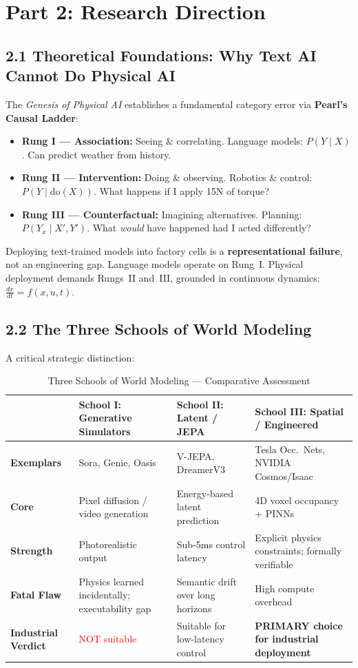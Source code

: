 \documentclass[11pt,a4paper]{article}
\begin{document}
\section{Part 2: Research Direction}

\subsection{2.1 Theoretical Foundations: Why Text AI Cannot Do Physical AI}
The \textit{Genesis of Physical AI} establishes a fundamental category error via \textbf{Pearl's Causal Ladder}:
\begin{itemize}
    \item \textbf{Rung I --- Association:} Seeing \& correlating. Language models: $P(Y \mid X)$. Can predict weather from history.
    \item \textbf{Rung II --- Intervention:} Doing \& observing. Robotics \& control: $P(Y \mid \text{do}(X))$. What happens if I apply 15N of torque?
    \item \textbf{Rung III --- Counterfactual:} Imagining alternatives. Planning: $P(Y_x \mid X', Y')$. What \textit{would} have happened had I acted differently?
\end{itemize}
Deploying text-trained models into factory cells is a \textbf{representational failure}, not an engineering gap. Language models operate on Rung~I. Physical deployment demands Rungs~II and~III, grounded in continuous dynamics: $\frac{dx}{dt} = f(x, u, t)$.

\subsection{2.2 The Three Schools of World Modeling}
A critical strategic distinction:
\begin{table}[h!]
\centering
\small
\begin{tabularx}{\textwidth}{@{}l X X X@{}}
\toprule
& \textbf{School I: Generative Simulators} & \textbf{School II: Latent / JEPA} & \textbf{School III: Spatial / Engineered} \\
\midrule
\textbf{Exemplars} & Sora, Genie, Oasis & V-JEPA, DreamerV3 & Tesla Occ.\ Nets, NVIDIA Cosmos/Isaac \\
\textbf{Core} & Pixel diffusion / video generation & Energy-based latent prediction & 4D voxel occupancy + PINNs \\
\textbf{Strength} & Photorealistic output & Sub-5ms control latency & Explicit physics constraints; formally verifiable \\
\textbf{Fatal Flaw} & Physics learned incidentally; executability gap & Semantic drift over long horizons & High compute overhead \\
\textbf{Industrial Verdict} & \textcolor{red}{NOT suitable} & \textcolor{primary}{Suitable for low-latency control} & \textcolor{accentgold}{\textbf{PRIMARY choice for industrial deployment}} \\
\bottomrule
\end{tabularx}
\caption{Three Schools of World Modeling --- Comparative Assessment}
\end{table}
\end{document}
